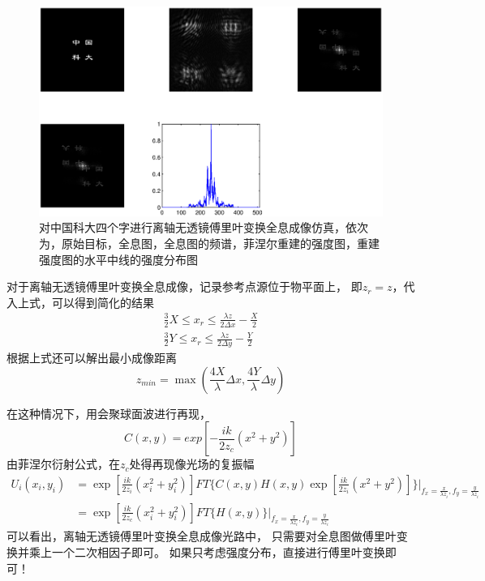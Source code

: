 \documentclass[11pt,a4paper]{article}
\begin{document}
\begin{figure}[htb]
  \centering
  \includegraphics[width=\textwidth]{zkd.eps}
  \caption{对中国科大四个字进行离轴无透镜傅里叶变换全息成像仿真，依次为，原始目标，全息图，全息图的频谱，菲涅尔重建的强度图，重建强度图的水平中线的强度分布图}
  \label{fig:res_zkd}
\end{figure}



对于离轴无透镜傅里叶变换全息成像，记录参考点源位于物平面上，
即$z_r=z$，代入上式，可以得到简化的结果
\begin{equation}
\begin{split}
\frac{3}{2}X\le x_r\le\frac{\lambda z}{2\Delta x} - \frac{X}{2} \\
\frac{3}{2}Y\le x_r\le\frac{\lambda z}{2\Delta y} - \frac{Y}{2} 
\end{split}
\end{equation}
根据上式还可以解出最小成像距离
\begin{equation}
z_{min} = \max(\frac{4X}{\lambda}\Delta x, \frac{4Y}{\lambda} \Delta y )
\end{equation}


在这种情况下，用会聚球面波进行再现，
\[
C(x,y) = exp[-\frac{i k }{2 z_c}(x^2+y^2)]
\]
由菲涅尔衍射公式，在$z_c$处得再现像光场的复振幅
\begin{equation}
\begin{split}
U_i(x_i,y_i) &= \exp[\frac{i k}{2 z_i}(x_i^2+y_i^2)] FT\{C(x,y)H(x,y)\exp[\frac{i k}{2 z_i}(x^2+y^2)]\}|_{f_x=\frac{x}{\lambda z_i}, f_y=\frac{y}{\lambda z_i}} \\
			&= \exp[\frac{i k}{2 z_c}(x_i^2+y_i^2)] FT\{ H(x,y)\}|_{f_x=\frac{x}{\lambda z_i}, f_y=\frac{y}{\lambda z_i}}
\end{split}
\end{equation}
可以看出，离轴无透镜傅里叶变换全息成像光路中，
只需要对全息图做傅里叶变换并乘上一个二次相因子即可。
如果只考虑强度分布，直接进行傅里叶变换即可！
\end{document}

